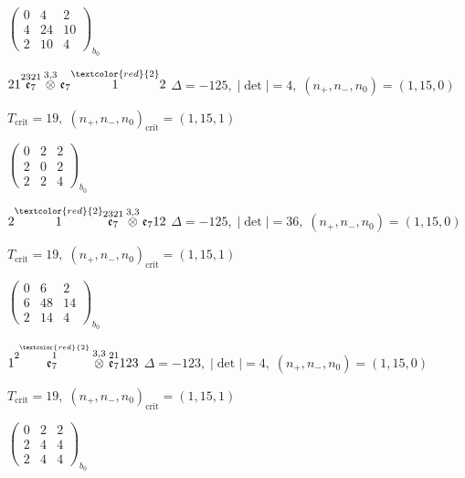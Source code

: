 \documentclass[10pt]{article}
\begin{document}
\hspace{2em}$\left(\begin{smallmatrix}0 & 4 & 2 \\ 4 & 24 & 10 \\ 2 & 10 & 4\end{smallmatrix}\right)_{\!b_0}$

\smallskip

$21\overset{2321}{\mathfrak{e}_7}\overset{3,3}{\otimes}\mathfrak{e}_7\overset{\textcolor{red}{2}}{1}2$ \quad $\Delta=-125,\; |\det|=4,\; (n_+,n_-,n_0)=(1,15,0)$

\hspace{1em}$T_{\text{crit}}=19,\; (n_+,n_-,n_0)_{\text{crit}}=(1,15,1)$

\hspace{2em}$\left(\begin{smallmatrix}0 & 2 & 2 \\ 2 & 0 & 2 \\ 2 & 2 & 4\end{smallmatrix}\right)_{\!b_0}$

$2\overset{\textcolor{red}{2}}{1}\overset{2321}{\mathfrak{e}_7}\overset{3,3}{\otimes}\mathfrak{e}_712$ \quad $\Delta=-125,\; |\det|=36,\; (n_+,n_-,n_0)=(1,15,0)$

\hspace{1em}$T_{\text{crit}}=19,\; (n_+,n_-,n_0)_{\text{crit}}=(1,15,1)$

\hspace{2em}$\left(\begin{smallmatrix}0 & 6 & 2 \\ 6 & 48 & 14 \\ 2 & 14 & 4\end{smallmatrix}\right)_{\!b_0}$

\smallskip

$1\overset{2\overset{\textcolor{red}{2}}{1}}{\mathfrak{e}_7}\overset{3,3}{\otimes}\overset{21}{\mathfrak{e}_7}123$ \quad $\Delta=-123,\; |\det|=4,\; (n_+,n_-,n_0)=(1,15,0)$

\hspace{1em}$T_{\text{crit}}=19,\; (n_+,n_-,n_0)_{\text{crit}}=(1,15,1)$

\hspace{2em}$\left(\begin{smallmatrix}0 & 2 & 2 \\ 2 & 4 & 4 \\ 2 & 4 & 4\end{smallmatrix}\right)_{\!b_0}$
\end{document}
